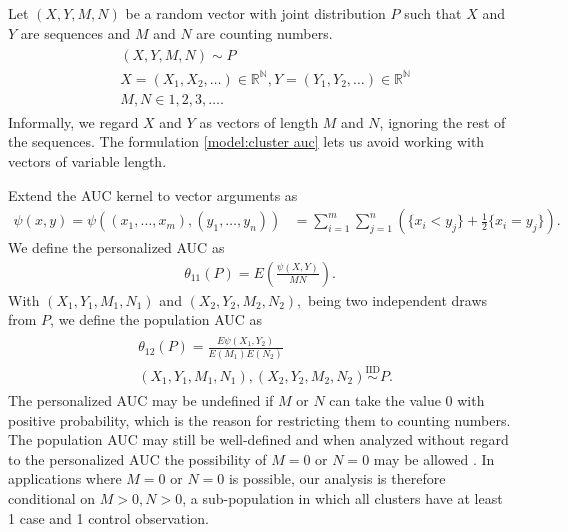 \documentclass[12pt]{article}
\DeclareMathOperator{\AUC}{AUC}
\newcommand{\E}{E}
\renewcommand{\P}{P}
\newcommand{\cind}{\perp \!\!\! \perp}
\newcommand{\aucindiv}{\theta_{11}}%
\newcommand{\aucpop}{\theta_{12}}%
\newcommand{\kernel}{\psi}
\begin{document}
Let $(X,Y,M,N)$ be a random vector
with joint distribution $\P$  such that $X$ and $Y$ are sequences and $M$ and $N$ are counting numbers.%
\begin{gather}
\begin{aligned}\label{model:cluster auc}
  &(X,Y,M,N) \sim \P\\
  &X=(X_1,X_2,\ldots)\in\mathbb{R}^\mathbb{N}, Y=(Y_1,Y_2,\ldots)\in\mathbb{R}^\mathbb{N}\\
  &M,N \in 1,2,3,\ldots .
\end{aligned}
\end{gather}
Informally, we regard $X$ and $Y$ as vectors of length $M$ and $N$, ignoring the rest of the sequences. The formulation \eqref{model:cluster auc} lets us avoid working with vectors of variable length.

Extend the AUC kernel to vector arguments as
\begin{align}
  \kernel(x,y)=\kernel((x_1,\ldots,x_m),(y_1,\ldots,y_n))&=\sum_{i=1}^m\sum_{j=1}^n\left(\{x_i<y_j\}+\frac{1}{2}\{x_i=y_j\}\right).\label{defn:auc kernel}
\end{align}
We define the personalized AUC as
\begin{align}
  \aucindiv(\P)=\E\left(\frac{\psi(X,Y)}{MN} \right).
  \label{defn:aucindiv}
\end{align}
With $(X_1,Y_1,M_1,N_1)$ and $(X_2,Y_2,M_2,N_2),$ being two independent draws from $P$, we define the population AUC as
\begin{gather}
  \begin{aligned}
  &\aucpop(\P)=\frac{\E\psi(X_1,Y_2)}{\E(M_1)\E(N_2)}\label{defn:aucpop}\\
  &(X_1,Y_1,M_1,N_1),(X_2,Y_2,M_2,N_2) \overset{\text{IID}}{\sim} \P.
\end{aligned}
\end{gather}
The personalized AUC may be undefined if $M$ or $N$ can take the value
$0$ with positive probability, which is the reason for restricting
them to counting numbers. The population AUC may still be well-defined
and when analyzed without regard to the personalized AUC the possibility
of $M=0$ or $N=0$ may be allowed \citep{obuchowski1997}. In
applications where $M=0$ or $N=0$ is possible, our analysis is
therefore conditional on $M>0,N>0$, a sub-population in which all
clusters have at least 1 case and 1 control observation.
\end{document}
